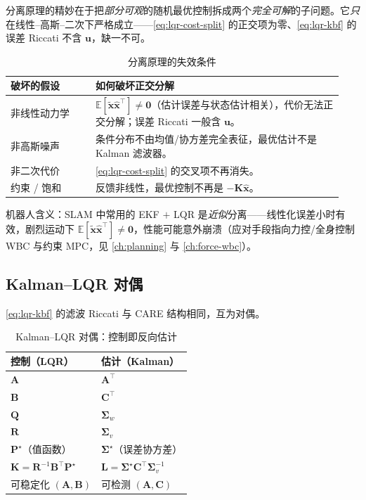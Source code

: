 \begin{insight}
分离原理的精妙在于把\emph{部分可观}的随机最优控制拆成两个\emph{完全可解}的子问题。它\emph{只}在线性--高斯--二次下严格成立——\cref{eq:lqr-cost-split} 的正交项为零、\cref{eq:lqr-kbf} 的误差 Riccati 不含 $\mathbf u$，缺一不可。
\end{insight}

\begin{table}[H]\centering\small
\caption{分离原理的失效条件}
\label{tab:lqr-sep-fail}
\begin{tabular}{p{0.24\linewidth}p{0.70\linewidth}}
\toprule
破坏的假设 & 如何破坏正交分解 \\
\midrule
非线性动力学 & $\mathbb E[\tilde{\mathbf x}\hat{\mathbf x}^\top]\ne\mathbf0$（估计误差与状态估计相关），代价无法正交分解；误差 Riccati 一般含 $\mathbf u$。 \\
非高斯噪声 & 条件分布不由均值/协方差完全表征，最优估计不是 Kalman 滤波器。 \\
非二次代价 & \cref{eq:lqr-cost-split} 的交叉项不再消失。 \\
约束 / 饱和 & 反馈非线性，最优控制不再是 $-\mathbf K\hat{\mathbf x}$。 \\
\bottomrule
\end{tabular}
\end{table}

机器人含义：SLAM 中常用的 EKF $+$ LQR 是\emph{近似}分离——线性化误差小时有效，剧烈运动下 $\mathbb E[\tilde{\mathbf x}\hat{\mathbf x}^\top]\ne\mathbf0$，性能可能意外崩溃（应对手段指向力控/全身控制 WBC 与约束 MPC，见 \cref{ch:planning} 与 \cref{ch:force-wbc}）。

\subsection{Kalman--LQR 对偶}
\label{sec:lqr-duality}

\cref{eq:lqr-kbf} 的滤波 Riccati 与 CARE 结构相同，互为对偶。

\begin{table}[H]\centering\small
\caption{Kalman--LQR 对偶：控制即反向估计}
\label{tab:lqr-duality}
\begin{tabular}{ll}
\toprule
控制（LQR） & 估计（Kalman） \\
\midrule
$\mathbf A$ & $\mathbf A^\top$ \\
$\mathbf B$ & $\mathbf C^\top$ \\
$\mathbf Q$ & $\boldsymbol\Sigma_w$ \\
$\mathbf R$ & $\boldsymbol\Sigma_v$ \\
$\mathbf P^\star$（值函数） & $\boldsymbol\Sigma^\star$（误差协方差） \\
$\mathbf K=\mathbf R^{-1}\mathbf B^\top\mathbf P^\star$ & $\mathbf L=\boldsymbol\Sigma^\star\mathbf C^\top\boldsymbol\Sigma_v^{-1}$ \\
可稳定化 $(\mathbf A,\mathbf B)$ & 可检测 $(\mathbf A,\mathbf C)$ \\
\bottomrule
\end{tabular}
\end{table}

